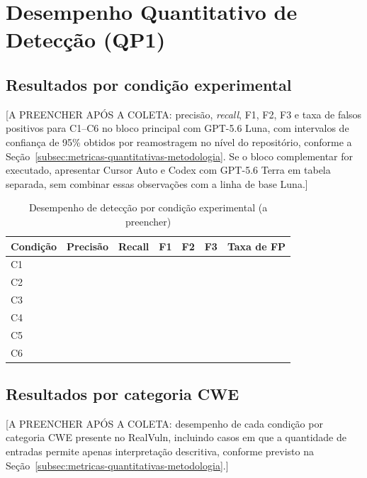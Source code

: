 \section{Desempenho Quantitativo de Detecção (QP1)}\label{sec:desempenho-quantitativo}

\subsection{Resultados por condição experimental}\label{subsec:resultados-por-condicao}

[A PREENCHER APÓS A COLETA: precisão, \textit{recall}, F1, F2, F3 e taxa de falsos positivos para C1--C6 no bloco principal com GPT-5.6 Luna, com intervalos de confiança de 95\% obtidos por reamostragem no nível do repositório, conforme a Seção~\ref{subsec:metricas-quantitativas-metodologia}. Se o bloco complementar for executado, apresentar Cursor Auto e Codex com GPT-5.6 Terra em tabela separada, sem combinar essas observações com a linha de base Luna.]

\begin{table}[htb]
\ABNTEXfontereduzida
\caption{\label{tab:resultados-deteccao-condicao}Desempenho de detecção por condição experimental (a preencher)}
\centering
\begin{tabularx}{\textwidth}{|l|X|X|X|X|X|X|}
\hline
\textbf{Condição} & \textbf{Precisão} & \textbf{Recall} & \textbf{F1} & \textbf{F2} & \textbf{F3} & \textbf{Taxa de FP} \\
\hline
C1 & & & & & & \\
\hline
C2 & & & & & & \\
\hline
C3 & & & & & & \\
\hline
C4 & & & & & & \\
\hline
C5 & & & & & & \\
\hline
C6 & & & & & & \\
\hline
\end{tabularx}
\end{table}

\subsection{Resultados por categoria CWE}\label{subsec:resultados-por-cwe}

[A PREENCHER APÓS A COLETA: desempenho de cada condição por categoria CWE presente no RealVuln, incluindo casos em que a quantidade de entradas permite apenas interpretação descritiva, conforme previsto na Seção~\ref{subsec:metricas-quantitativas-metodologia}.]

